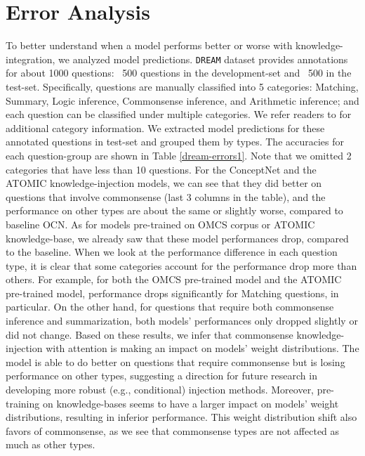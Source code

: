 \documentclass[11pt,a4paper]{article}
\begin{document}
\section{Error Analysis}
To better understand when a model performs better or worse with knowledge-integration, we analyzed model predictions. \texttt{DREAM} dataset provides annotations for about 1000 questions: ~500 questions in the development-set and ~500 in the test-set. Specifically, questions are manually classified into 5 categories: Matching, Summary, Logic inference, Commonsense inference, and Arithmetic inference; and each question can be classified under multiple categories. We refer readers to \citet{TACL1534} for additional category information. We extracted model predictions for these annotated questions in test-set and grouped them by types. The accuracies for each question-group are shown in Table \ref{dream-errors1}. Note that we omitted 2 categories that have less than 10 questions. For the ConceptNet and the ATOMIC knowledge-injection models, we can see that they did better on questions that involve commonsense (last 3 columns in the table), and the performance on other types are about the same or slightly worse, compared to baseline OCN. As for models pre-trained on OMCS corpus or ATOMIC knowledge-base, we already saw that these model performances drop, compared to the baseline. When we look at the performance difference in each question type, it is clear that some categories account for the performance drop more than others. For example, for both the OMCS pre-trained model and the ATOMIC pre-trained model, performance drops significantly for Matching questions, in particular. On the other hand, for questions that require both commonsense inference and summarization, both models' performances only dropped slightly or did not change. Based on these results, we infer that commonsense knowledge-injection with attention is making an impact on models' weight distributions. The model is able to do better on questions that require commonsense but is losing performance on other types, suggesting a direction for future research in developing more robust (e.g., conditional) injection methods. Moreover, pre-training on knowledge-bases seems to have a larger impact on models' weight distributions, resulting in inferior performance. This weight distribution shift also favors of commonsense, as we see that commonsense types are not affected as much as other types. 
\end{document}
